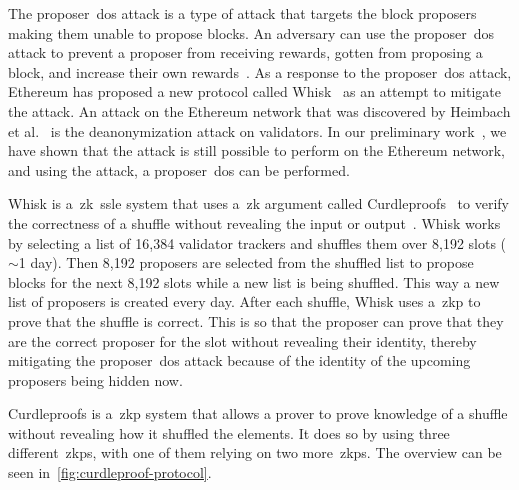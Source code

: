 The proposer~\gls{dos} attack is a type of attack that targets the block proposers making them unable to propose blocks.
An adversary can use the proposer~\gls{dos} attack to prevent a proposer from receiving rewards, gotten from proposing a block, and increase their own rewards~\cite{EthereumSSLE2024}.
As a response to the proposer~\gls{dos} attack, Ethereum has proposed a new protocol called Whisk~\cite{Whisk2024} as an attempt to mitigate the attack.
An attack on the Ethereum network that was discovered by Heimbach et al.~\cite{heimbach2024deanonymizingethereumvalidatorsp2p} is the deanonymization attack on validators.
In our preliminary work~\cite{ouroldpaper}, we have shown that the attack is still possible to perform on the Ethereum network, and using the attack, a proposer~\gls{dos} can be performed.


Whisk is a~\gls{zk}~\gls{ssle} system that uses a~\gls{zk} argument called Curdleproofs~\cite{Curdleproofs} to verify the correctness of a shuffle without revealing the input or output~\cite{10.1145/3419614.3423258}.
Whisk works by selecting a list of 16,384 validator trackers and shuffles them over 8,192 slots ($\sim$1 day).
Then 8,192 proposers are selected from the shuffled list to propose blocks for the next 8,192 slots while a new list is being shuffled.
This way a new list of proposers is created every day.
After each shuffle, Whisk uses a~\gls{zkp} to prove that the shuffle is correct.
This is so that the proposer can prove that they are the correct proposer for the slot without revealing their identity, thereby mitigating the proposer~\gls{dos} attack because of the identity of the upcoming proposers being hidden now.

Curdleproofs is a~\gls{zkp} system that allows a prover to prove knowledge of a shuffle without revealing how it shuffled the elements.
It does so by using three different~\glspl{zkp}, with one of them relying on two more~\glspl{zkp}.
The overview can be seen in~\autoref{fig:curdleproof-protocol}.

